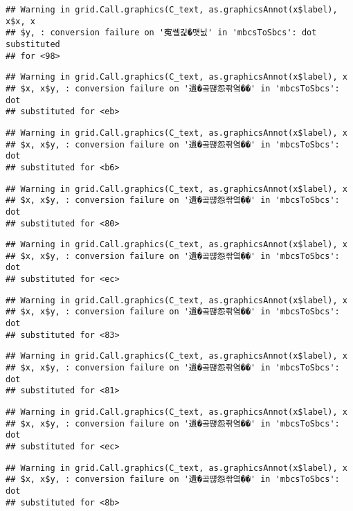 \documentclass[]{article}
\begin{document}
\begin{verbatim}
## Warning in grid.Call.graphics(C_text, as.graphicsAnnot(x$label), x$x, x
## $y, : conversion failure on '寃쎌긽�먯닔' in 'mbcsToSbcs': dot substituted
## for <98>
\end{verbatim}

\begin{verbatim}
## Warning in grid.Call.graphics(C_text, as.graphicsAnnot(x$label), x
## $x, x$y, : conversion failure on '遺�곸떊怨좎옄��' in 'mbcsToSbcs': dot
## substituted for <eb>
\end{verbatim}

\begin{verbatim}
## Warning in grid.Call.graphics(C_text, as.graphicsAnnot(x$label), x
## $x, x$y, : conversion failure on '遺�곸떊怨좎옄��' in 'mbcsToSbcs': dot
## substituted for <b6>
\end{verbatim}

\begin{verbatim}
## Warning in grid.Call.graphics(C_text, as.graphicsAnnot(x$label), x
## $x, x$y, : conversion failure on '遺�곸떊怨좎옄��' in 'mbcsToSbcs': dot
## substituted for <80>
\end{verbatim}

\begin{verbatim}
## Warning in grid.Call.graphics(C_text, as.graphicsAnnot(x$label), x
## $x, x$y, : conversion failure on '遺�곸떊怨좎옄��' in 'mbcsToSbcs': dot
## substituted for <ec>
\end{verbatim}

\begin{verbatim}
## Warning in grid.Call.graphics(C_text, as.graphicsAnnot(x$label), x
## $x, x$y, : conversion failure on '遺�곸떊怨좎옄��' in 'mbcsToSbcs': dot
## substituted for <83>
\end{verbatim}

\begin{verbatim}
## Warning in grid.Call.graphics(C_text, as.graphicsAnnot(x$label), x
## $x, x$y, : conversion failure on '遺�곸떊怨좎옄��' in 'mbcsToSbcs': dot
## substituted for <81>
\end{verbatim}

\begin{verbatim}
## Warning in grid.Call.graphics(C_text, as.graphicsAnnot(x$label), x
## $x, x$y, : conversion failure on '遺�곸떊怨좎옄��' in 'mbcsToSbcs': dot
## substituted for <ec>
\end{verbatim}

\begin{verbatim}
## Warning in grid.Call.graphics(C_text, as.graphicsAnnot(x$label), x
## $x, x$y, : conversion failure on '遺�곸떊怨좎옄��' in 'mbcsToSbcs': dot
## substituted for <8b>
\end{verbatim}
\end{document}
